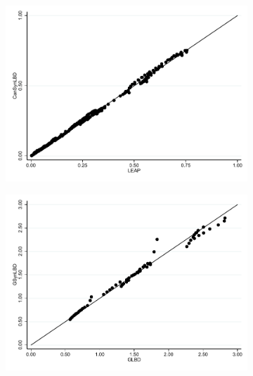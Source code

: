 
\begin{figure}
\begin{subfigure}[h]{0.48\linewidth}
\includegraphics[trim=0 40 0 0,clip, width=\linewidth]{graphs/Share_of_firms_by_NAICS_two-digit_and_year_private_bw.pdf}
\end{subfigure}
\hfill
\begin{subfigure}[h]{0.48\linewidth}
\includegraphics[trim=0 40 0 0,clip,width=\linewidth]{graphs/Share_of_firms_by_NAICS_and_year_bw_GsynLBD.pdf}
\end{subfigure}\\
\begin{subfigure}[h]{0.48\linewidth}

\end{subfigure}
\end{figure}
